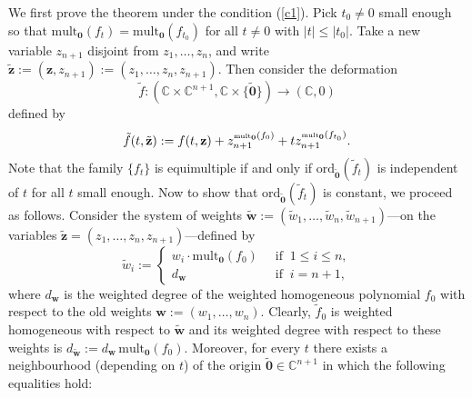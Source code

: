 \documentclass[a4paper,fleqn,11pt]{amsart}
\theoremstyle{definition}
\theoremstyle{remark}
\numberwithin{equation}{section}
\begin{document}
We first prove the theorem under the condition (\ref{c1}).
Pick $t_0\not=0$ small enough so that $\mbox{mult}_{\mathbf{0}}(f_{t})=\mbox{mult}_{\mathbf{0}}(f_{t_0})$ for all $t\not=0$ with $\vert t\vert\leq\vert t_0\vert$. Take a new variable $z_{n+1}$ disjoint from $z_1,\ldots,z_n$, and write $
\tilde{\mathbf{z}}:=(\mathbf{z},z_{n+1}):=
(z_1,\ldots,z_n,z_{n+1})$. 
Then consider the deformation 
\begin{equation*}
\tilde f\colon (\mathbb{C}\times \mathbb{C}^{n+1},\mathbb{C}\times \{\tilde{\mathbf{0}}\})\to(\mathbb{C},0)
\end{equation*}
defined by
\begin{equation*}
\tilde f(t,\tilde{\mathbf{z}}):=f(t,\mathbf{z})+z_{n+1}^{\mbox{\tiny mult}_{\mathbf{0}}(f_{0})}+tz_{n+1}^{\mbox{\tiny mult}_{\mathbf{0}}(f_{t_0})}.
\end{equation*}
Note that the family $\{f_t\}$ is equimultiple if and only if $\mbox{ord}_{\tilde{\mathbf{0}}}(\tilde f_{t})$ is independent of $t$ for all $t$ small enough. Now to show that $\mbox{ord}_{\tilde{\mathbf{0}}}(\tilde f_{t})$ is constant, we proceed as follows. Consider the system of weights $\tilde{\mathbf{w}}:=(\tilde w_1,\ldots,\tilde w_n,\tilde w_{n+1})$---on the variables $\tilde{\mathbf{z}}=(z_1,\ldots,z_n,z_{n+1})$---defined by
\begin{equation*}
\tilde w_i:=\left\{
\begin{aligned}
w_i \cdot \mbox{mult}_{\mathbf{0}}(f_{0}) &\ \mbox{ if }\ 1\leq i\leq n,\\
d_{\mathbf{w}} &\ \mbox{ if }\ i=n+1,
\end{aligned}
\right.
\end{equation*}
where $d_{\mathbf{w}}$ is the weighted degree of the weighted homogeneous polynomial $f_0$ with respect to the old weights $\mathbf{w}:=(w_1,\ldots,w_n)$. Clearly, $\tilde f_0$ is weighted homogeneous with respect to $\tilde{\mathbf{w}}$ and its weighted degree with respect to these weights is $d_{\tilde{\mathbf{w}}}:=d_{\mathbf{w}}\, \mbox{mult}_{\mathbf{0}}(f_{0})$. 
Moreover, for every $t$ there exists a neighbourhood (depending on $t$) of the origin $\tilde{\mathbf{0}}\in\mathbb{C}^{n+1}$ in which the following equalities hold:
\end{document}
